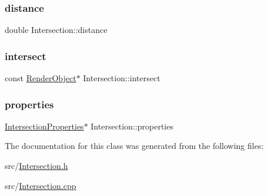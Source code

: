 \subsubsection{\texorpdfstring{distance}{distance}}
{\footnotesize\ttfamily double Intersection\+::distance\hspace{0.3cm}{\ttfamily [private]}}

\mbox{\label{classIntersection_a8241676dd0f240769dc189132dc3c5bb}} 
\subsubsection{\texorpdfstring{intersect}{intersect}}
{\footnotesize\ttfamily const \mbox{\hyperlink{classRenderObject}{Render\+Object}}$\ast$ Intersection\+::intersect\hspace{0.3cm}{\ttfamily [private]}}

\mbox{\label{classIntersection_ad9d38892c2e47f51ae2497904050c00e}} 
\subsubsection{\texorpdfstring{properties}{properties}}
{\footnotesize\ttfamily \mbox{\hyperlink{classIntersectionProperties}{Intersection\+Properties}}$\ast$ Intersection\+::properties\hspace{0.3cm}{\ttfamily [private]}}



The documentation for this class was generated from the following files\+:\begin{DoxyCompactItemize}
\item 
src/\mbox{\hyperlink{Intersection_8h}{Intersection.\+h}}\item 
src/\mbox{\hyperlink{Intersection_8cpp}{Intersection.\+cpp}}\end{DoxyCompactItemize}
